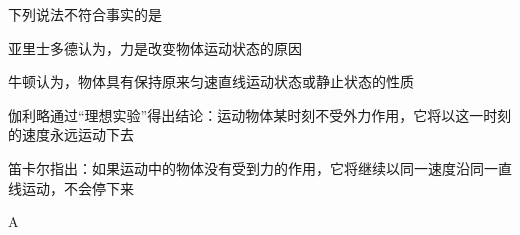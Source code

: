 下列说法不符合事实的是\paren[]
\begin{choices}
    \item 亚里士多德认为，力是改变物体运动状态的原因
    \item 牛顿认为，物体具有保持原来匀速直线运动状态或静止状态的性质
    \item 伽利略通过“理想实验”得出结论：运动物体某时刻不受外力作用，它将以这一时刻的速度永远运动下去
    \item 笛卡尔指出：如果运动中的物体没有受到力的作用，它将继续以同一速度沿同一直线运动，不会停下来 
\end{choices}
\begin{answer}
    A
\end{answer}